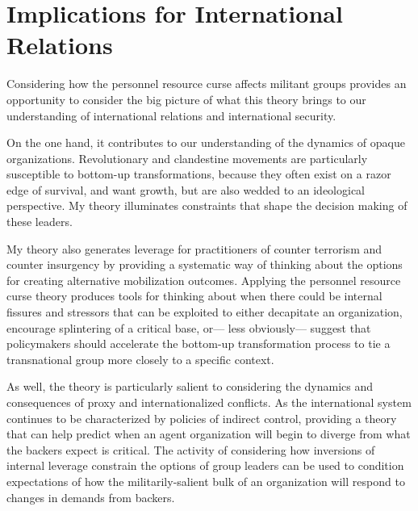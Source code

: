 \section{Implications for International Relations}

Considering how the personnel resource curse affects militant groups provides an opportunity to consider the big picture of what this theory brings to our understanding of international relations and international security.

On the one hand, it contributes to our understanding of the dynamics of opaque organizations. Revolutionary and clandestine movements are particularly susceptible to bottom-up transformations, because they often exist on a razor edge of survival, and want growth, but are also wedded to an ideological perspective. My theory illuminates constraints that shape the decision making of these leaders.

My theory also generates leverage for practitioners of counter terrorism and counter insurgency by providing a systematic way of thinking about the options for creating alternative mobilization outcomes. Applying the personnel resource curse theory produces tools for thinking about when there could be internal fissures and stressors that can be exploited to either decapitate an organization, encourage splintering of a critical base, or— less obviously— suggest that policymakers should accelerate the bottom-up transformation process to tie a transnational group more closely to a specific context.

As well, the theory is particularly salient to considering the dynamics and consequences of proxy and internationalized conflicts. As the international system continues to be characterized by policies of indirect control, providing a theory that can help predict when an agent organization will begin to diverge from what the backers expect is critical. The activity of considering how inversions of internal leverage constrain the options of group leaders can be used to condition expectations of how the militarily-salient bulk of an organization will respond to changes in demands from backers. 